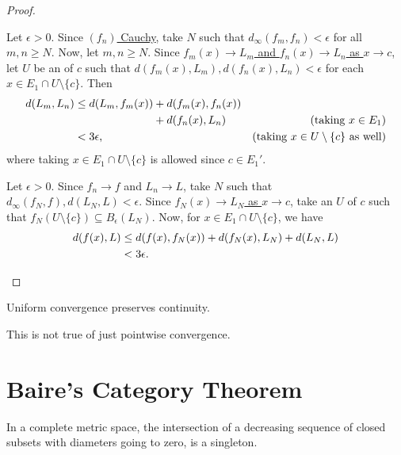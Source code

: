 	\begin{proof}
		\begin{mylist}
			\item Let $\epsilon > 0$. Since \uline{$(f_n)$ Cauchy}, take $N$ such that $d_\infty(f_m, f_n) < \epsilon$ for all $m, n\ge N$. Now, let $m, n\ge N$. Since \uline{$f_m(x)\to L_m$ and $f_n(x)\to L_n$ as $x\to c$}, let $U$ be an \onbd of $c$ such that $d(f_m(x), L_m), d(f_n(x), L_n) < \epsilon$ for each $x\in E_1\cap U\setminus\{c\}$. Then
			\begin{alignat*}{2}
				d(L_m, L_n)
				& \le d(L_m, f_m(x)) + d(f_m(x), f_n(x)) \\
				& \phantom{{}\le d(L_m, f_m(x))} + d(f_n(x), L_n) & \text{(taking $x\in E_1$)}\\
				& < 3\epsilon\text, & \text{(taking $x\in U\setminus \{c\}$ as well)}
			\end{alignat*}
			where taking $x\in E_1\cap U\setminus\{c\}$ is allowed since \uline{$c\in E_1'$}.
			
			
			\item Let $\epsilon > 0$. Since \uline{$f_n\to f$} and \uline{$L_n\to L$}, take $N$ such that $d_\infty(f_N, f), d(L_N, L) < \epsilon$. Since \uline{$f_N(x)\to L_N$ as $x\to c$}, take an \onbd $U$ of $c$ such that $f_N(U\setminus\{c\})\subseteq B_\epsilon(L_N)$. Now, for $x\in E_1\cap U\setminus\{c\}$, we have
			\begin{alignat*}{2}
				d(f(x), L)
				& \le d(f(x), f_N(x)) + d(f_N(x), L_N) + d(L_N, L)\\
				& < 3\epsilon\text. \tag*{\qedhere}
			\end{alignat*}
		\end{mylist}
	\end{proof}
	
	\begin{cor}
		Uniform convergence preserves continuity.
	\end{cor}
	
	\noindent This is \ofc not true of just pointwise convergence.
	
	
	


\section{Baire's Category Theorem}

	\begin{prp}
		In a complete metric space, the intersection of a decreasing sequence of closed subsets with diameters going to zero, is a singleton.
	\end{prp}
	
